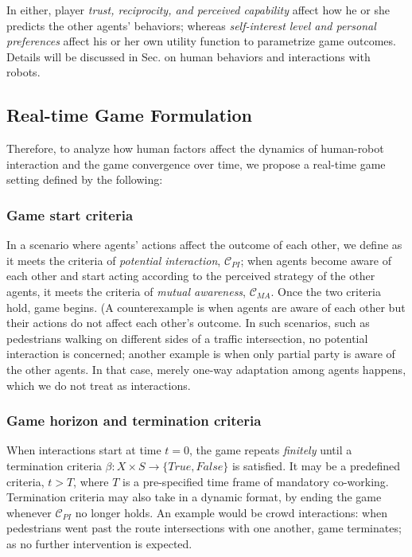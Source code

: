 \documentclass[letterpaper, 10 pt, conference]{ieeeconf}  %
\begin{document}
In either, player \textit{trust, reciprocity, and perceived capability} affect how he or she predicts the other agents' behaviors; whereas \textit{self-interest level and personal preferences} affect his or her own utility function to parametrize game outcomes. Details will be discussed in Sec. on human behaviors and interactions with robots. 

\subsection{Real-time Game Formulation}
Therefore, to analyze how human factors affect the dynamics of human-robot interaction and the game convergence over time, we propose a real-time game setting defined by the following:
\subsubsection{Game start criteria}
In a scenario where agents' actions affect the outcome of each other, we define as it meets the criteria of \textit{potential interaction}, $\mathcal{C}_{PI}$; when agents become aware of each other and start acting according to the perceived strategy of the other agents, it meets the criteria of \textit{mutual awareness}, $\mathcal{C}_{MA}$. Once the two criteria hold, game begins. 
(A counterexample is when agents are aware of each other but their actions do not affect each other's outcome. In such scenarios, such as pedestrians walking on different sides of a traffic intersection, no potential interaction is concerned; another example is when only partial party is aware of the other agents. In that case, merely one-way adaptation among agents happens, which we do not treat as interactions.%
\subsubsection{Game horizon and termination criteria}
When interactions start at time $t=0$, the game repeats \textit{finitely} until a termination criteria $\beta: X \times S \rightarrow \{True,False\}$ is satisfied. It may be a predefined criteria, $t>T$, where $T$ is a pre-specified time frame of mandatory co-working. Termination criteria may also take in a dynamic format, by ending the game whenever $\mathcal{C}_{PI}$ no longer holds. An example would be crowd interactions: when pedestrians went past the route intersections with one another, game terminates; as no further intervention is expected.
\end{document}

